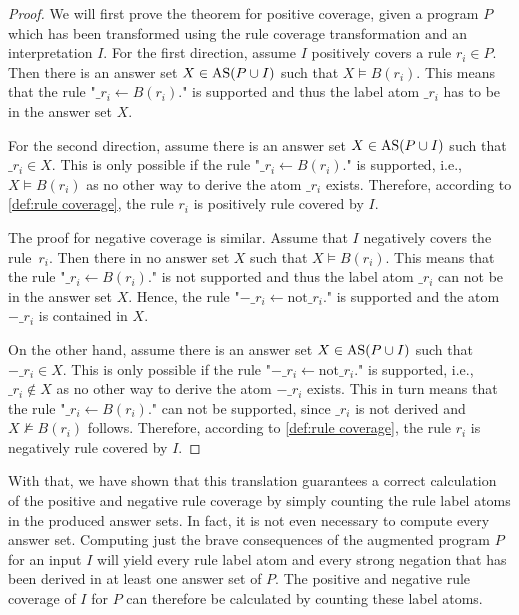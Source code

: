 \begin{proof}
\label{pr:rule transformation}
    We will first prove the theorem for positive coverage, given a program $P$ which has been transformed using the rule coverage transformation and an interpretation $I$. For the first direction, assume $I$ positively covers a rule \(r_i \in P\). Then there is an answer set \(X \in \operatorname{AS}(P \cup I)\) such that \(X \models B(r_i)\). This means that the rule "\(\_r_i \leftarrow B(r_i).\)" is supported and thus the label atom $\_r_i$ has to be in the answer set $X$. 
    
    For the second direction, assume there is an answer set \(X \in \operatorname{AS}(P \cup I)\) such that \(\_r_i \in X\). This is only possible if the rule "\(\_r_i \leftarrow B(r_i).\)" is supported, i.e., \(X \models B(r_i)\) as no other way to derive the atom $\_r_i$ exists. Therefore, according to \cref{def:rule coverage}, the rule $r_i$ is positively rule covered by $I$.

    The proof for negative coverage is similar. Assume that $I$ negatively covers the rule~$r_i$. Then there in no answer set $X$ such that \(X \models B(r_i)\). This means that the rule "\(\_r_i \leftarrow B(r_i).\)" is not supported and thus the label atom $\_r_i$ can not be in the answer set $X$. Hence, the rule "\(-\_r_i \leftarrow \text{not} \_r_i.\)" is supported and the atom $-\_r_i$ is contained in $X$.

    On the other hand, assume there is an answer set \(X \in \operatorname{AS}(P \cup I)\) such that \(-\_r_i \in X\). This is only possible if the rule "\(-\_r_i \leftarrow \text{not} \_r_i.\)" is supported, i.e., \(\_r_i \not\in X\) as no other way to derive the atom $-\_r_i$ exists. This in turn means that the rule "\(\_r_i \leftarrow B(r_i).\)" can not be supported, since $\_r_i$ is not derived and \(X \not\models B(r_i)\) follows. Therefore, according to \cref{def:rule coverage}, the rule $r_i$ is negatively rule covered by $I$.
\end{proof}

With that, we have shown that this translation guarantees a correct calculation of the positive and negative rule coverage by simply counting the rule label atoms in the produced answer sets. In fact, it is not even necessary to compute every answer set. Computing just the brave consequences of the augmented program $P$ for an input $I$ will yield every rule label atom and every strong negation that has been derived in at least one answer set of $P$. The positive and negative rule coverage of $I$ for $P$ can therefore be calculated by counting these label atoms. 

